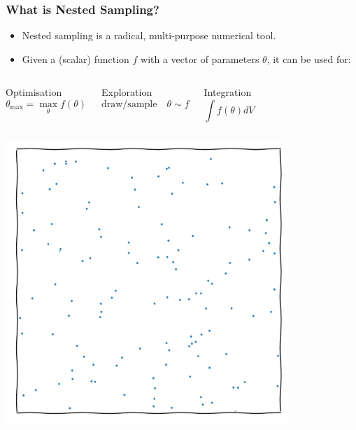 \documentclass[aspectratio=169]{beamer}
\begin{document}
\begin{frame}
    \frametitle{What is Nested Sampling?}
    \begin{itemize}
        \item Nested sampling is a radical, multi-purpose numerical tool.
        \item Given a (scalar) function $f$ with a vector of parameters $\theta$, it can be used for:
    \end{itemize}
    \vspace{-10pt}
    \begin{columns}[t]
        \begin{block}{Optimisation}
            \[\theta_\text{max} = \max_\theta{f(\theta)}\]
        \end{block}
        \begin{block}{Exploration}
            \vspace{-10pt}
            \[\text{draw/sample}\quad \theta\sim f\]
            \vspace{-15pt}
        \end{block}
        \begin{block}{Integration}
            \[\int f(\theta) dV \]
        \end{block}
    \end{columns}
    \begin{columns}[t]
        \centerline{\includegraphics[width=0.8\textwidth,page=13]{figures/himmelblau}}

\end{columns}
\end{frame}
\end{document}
